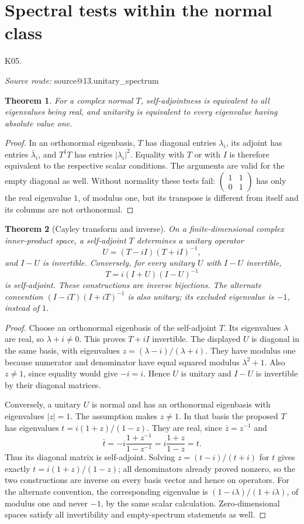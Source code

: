 \documentclass[11pt,a4paper]{book}
\makeatletter
\newtheorem{theorem}{Theorem}[chapter]
\theoremstyle{definition}\newtheorem{definition}[theorem]{Definition}
\theoremstyle{remark}\newtheorem{remark}[theorem]{Remark}
\newcommand{\Kentry}[2]{\section{#2}\label{k:#1}\noindent\textsf{\small K05.\detokenize{#1}}\par
  \begingroup\small\color{black!65}\textit{Source route: }\csname source@#1\endcsname\par\endgroup}
\makeatother
\begin{document}
\Kentry{13.unitary_spectrum}{Spectral tests within the normal class}
\begin{theorem}
For a complex normal $T$, self-adjointness is equivalent to all eigenvalues being real, and unitarity is equivalent to every eigenvalue having absolute value one.
\end{theorem}
\begin{proof}
In an orthonormal eigenbasis, $T$ has diagonal entries $\lambda_i$, its adjoint has entries $\bar\lambda_i$, and $T^\dagger T$ has entries $|\lambda_i|^2$. Equality with $T$ or with $I$ is therefore equivalent to the respective scalar conditions. The arguments are valid for the empty diagonal as well. Without normality these tests fail: $\begin{pmatrix}1&1\\0&1\end{pmatrix}$ has only the real eigenvalue $1$, of modulus one, but its transpose is different from itself and its columns are not orthonormal.
\end{proof}

\begin{theorem}[Cayley transform and inverse]
On a finite-dimensional complex inner-product space, a self-adjoint $T$ determines a unitary operator
\[
U=(T-iI)(T+iI)^{-1},
\]
and $I-U$ is invertible. Conversely, for every unitary $U$ with $I-U$ invertible,
\[
T=i(I+U)(I-U)^{-1}
\]
is self-adjoint. These constructions are inverse bijections. The alternate convention $(I-iT)(I+iT)^{-1}$ is also unitary; its excluded eigenvalue is $-1$, instead of $1$.
\end{theorem}
\begin{proof}
Choose an orthonormal eigenbasis of the self-adjoint $T$. Its eigenvalues $\lambda$ are real, so $\lambda+i\ne0$. This proves $T+iI$ invertible. The displayed $U$ is diagonal in the same basis, with eigenvalues $z=(\lambda-i)/(\lambda+i)$. They have modulus one because numerator and denominator have equal squared modulus $\lambda^2+1$. Also $z\ne1$, since equality would give $-i=i$. Hence $U$ is unitary and $I-U$ is invertible by their diagonal matrices.

Conversely, a unitary $U$ is normal and has an orthonormal eigenbasis with eigenvalues $|z|=1$. The assumption makes $z\ne1$. In that basis the proposed $T$ has eigenvalues $t=i(1+z)/(1-z)$. They are real, since $\bar z=z^{-1}$ and
\[
\bar t=-i\frac{1+z^{-1}}{1-z^{-1}}
=i\frac{1+z}{1-z}=t.
\]
Thus its diagonal matrix is self-adjoint. Solving $z=(t-i)/(t+i)$ for $t$ gives exactly $t=i(1+z)/(1-z)$; all denominators already proved nonzero, so the two constructions are inverse on every basis vector and hence on operators. For the alternate convention, the corresponding eigenvalue is $(1-i\lambda)/(1+i\lambda)$, of modulus one and never $-1$, by the same scalar calculation. Zero-dimensional spaces satisfy all invertibility and empty-spectrum statements as well.
\end{proof}
\end{document}
